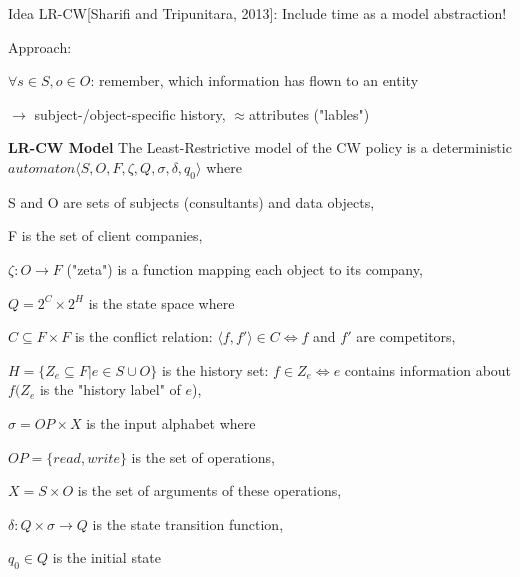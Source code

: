 \documentclass[a4paper]{article}
\renewcommand{\note}[2]{\begin{noteBox} \textbf{#1} #2 \end{noteBox}}
\begin{document}
\begin{multicols}{3}
    Idea LR-CW[Sharifi and Tripunitara, 2013]: Include time as a model abstraction!

    Approach:
    \begin{itemize*}
        \item $\forall s\in S,o\in O$: remember, which information has flown to an entity
        \item $\rightarrow$ subject-/object-specific history, $\approx$attributes ("lables")
    \end{itemize*}

    \note{LR-CW Model}{The Least-Restrictive model of the CW policy is a deterministic $automaton ⟨S,O,F,\zeta,Q,\sigma,\delta,q_0⟩$ where
        \begin{itemize*}
            \item S and O are sets of subjects (consultants) and data objects,
            \item F is the set of client companies,
            \item $\zeta:O\rightarrow F$ ("zeta") is a function mapping each object to its company,
            \item $Q=2^C \times 2^H$ is the state space where
            \begin{itemize*}
                \item $C\subseteq F\times F$ is the conflict relation: $⟨f,f'⟩\in C\Leftrightarrow f$ and $f'$ are competitors,
                \item $H=\{Z_e\subseteq F|e\in S\cup O\}$ is the history set: $f\in Z_e\Leftrightarrow e$ contains information about $f(Z_e$ is the "history label" of $e$),
            \end{itemize*}
            \item $\sigma=OP\times X$ is the input alphabet where
            \begin{itemize*}
                \item $OP=\{read,write\}$ is the set of operations,
                \item $X=S\times O$ is the set of arguments of these operations,
            \end{itemize*}
            \item $\delta:Q\times\sigma\rightarrow Q$ is the state transition function,
            \item $q_0\in Q$ is the initial state
        \end{itemize*}
    }


\end{multicols}
\end{document}
